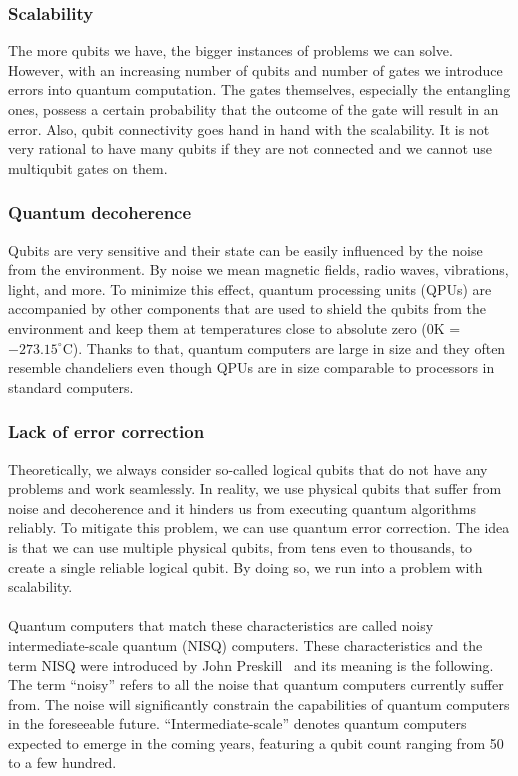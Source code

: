 \subsubsection{Scalability}
The more qubits we have, the bigger instances of problems we can solve. However, with an increasing number of qubits and number of gates we introduce errors into quantum computation. The gates themselves, especially the entangling ones, possess a certain probability that the outcome of the gate will result in an error. Also, qubit connectivity goes hand in hand with the scalability. It is not very rational to have many qubits if they are not connected and we cannot use multiqubit gates on them.

\subsubsection{Quantum decoherence}
Qubits are very sensitive and their state can be easily influenced by the noise from the environment. By noise we mean magnetic fields, radio waves, vibrations, light, and more. To minimize this effect, quantum processing units (QPUs) are accompanied by other components that are used to shield the qubits from the environment and keep them at temperatures close to absolute zero ($0$K = $-273.15^{\circ}$C). Thanks to that, quantum computers are large in size and they often resemble chandeliers even though QPUs are in size comparable to processors in standard computers.

\subsubsection{Lack of error correction}
Theoretically, we always consider so-called logical qubits that do not have any problems and work seamlessly. In reality, we use physical qubits that suffer from noise and decoherence and it hinders us from executing quantum algorithms reliably. To mitigate this problem, we can use quantum error correction. The idea is that we can use multiple physical qubits, from tens even to thousands, to create a single reliable logical qubit. By doing so, we run into a problem with scalability. 

\paragraph{}
Quantum computers that match these characteristics are called noisy intermediate-scale quantum (NISQ) computers. These characteristics and the term NISQ were introduced by John Preskill~\cite{nisq} and its meaning is the following. The term ``noisy'' refers to all the noise that quantum computers currently suffer from. The noise will significantly constrain the capabilities of quantum computers in the foreseeable future. ``Intermediate-scale'' denotes quantum computers expected to emerge in the coming years, featuring a qubit count ranging from 50 to a few hundred. 

